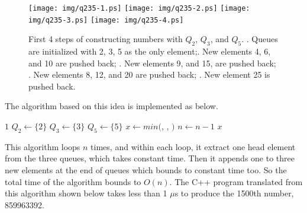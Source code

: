 \documentclass[UTF8]{article}
\begin{document}
\begin{figure}[htbp]
       \begin{center}
       	  \texttt{[image: img/q235-1.ps]}
       	  \texttt{[image: img/q235-2.ps]}
       	  \texttt{[image: img/q235-3.ps]}
       	  \texttt{[image: img/q235-4.ps]}
        \caption{First 4 steps of constructing numbers with $Q_2$, $Q_3$, and $Q_5$. . Queues are initialized with 2, 3, 5 as the only element;. New elements 4, 6, and 10 are pushed back; . New elements 9, and 15, are pushed back; . New elements 8, 12, and 20 are pushed back; . New element 25 is pushed back.} \label{fig:q235}
       \end{center}
\end{figure}

The algorithm based on this idea is implemented as below.

\begin{algorithmic}[1]
    \State \Return $1$
  \Else
    \State $Q_2 \gets \{ 2 \}$
    \State $Q_3 \gets \{ 3 \}$
    \State $Q_5 \gets \{ 5 \}$
      \State $x \gets min($, , $)$
        \State {}
        \State {}
        \State {}
        \State {}
        \State {}
        \State {}
        \State {}
      \Else
        \State {}
        \State {}
      \EndIf
      \State $n \gets n - 1$
    \EndWhile
    \State \Return $x$
  \EndIf
\EndFunction
\end{algorithmic}

This algorithm loops $n$ times, and within each loop, it extract one head
element from the three queues, which takes constant time. Then it appends
one to three new elements at the end of queues which bounds to constant time
too. So the total time of the algorithm bounds to $O(n)$. The C++ program
translated from this algorithm shown below takes less than 1 $\mu$s to
produce the 1500th number, 859963392.
\end{document}
